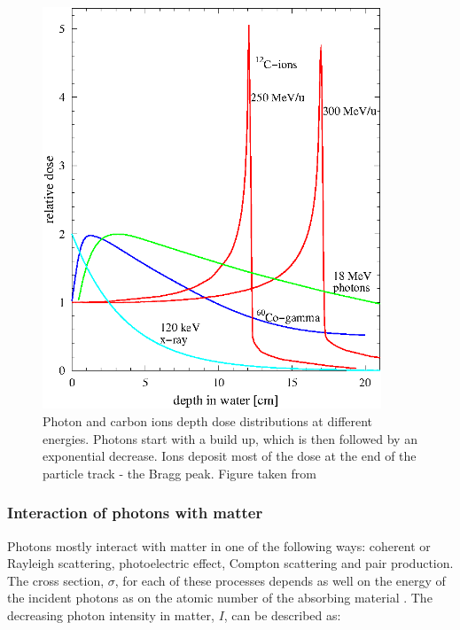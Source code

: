 \documentclass[type=dr, dr=rernat, accentcolor=tud7b,colorbacktitle, bigchapter, openright, twoside, 12pt ]{tudthesis}
\begin{document}
\begin{figure}[H]
\begin{center}
\includegraphics[width=0.9\textwidth]{./Images/depthdose.png}
\caption{Photon and carbon ions depth dose distributions at different energies. Photons start with a build up, which is then followed by an exponential decrease. Ions deposit most of the dose at the end of the particle track - the Bragg peak. Figure taken from \cite{Schardt2010} }
\label{ddp}
\end{center}
\end{figure}

\subsubsection{Interaction of photons with matter}

Photons mostly interact with matter in one of the following ways: coherent or Rayleigh scattering, photoelectric effect, Compton scattering and pair production. The cross section, $\sigma$, for each of these processes depends as well on the energy of the incident photons as on the atomic number of the absorbing material \cite{Lilley2006}. The decreasing photon intensity in matter, $I$, can be described as:
\end{document}
